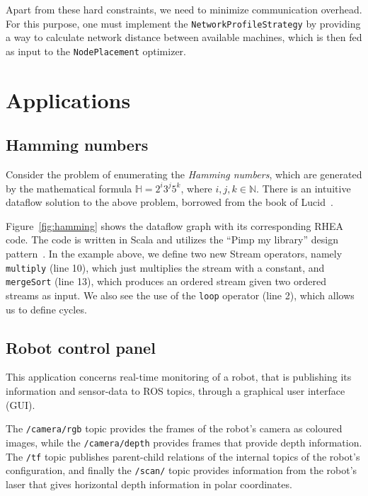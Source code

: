 \documentclass[sigplan,screen]{acmart}
\begin{document}
Apart from these hard constraints, we need to minimize communication overhead.
For this purpose, one must implement the \texttt{NetworkProfileStrategy} by providing
a way to calculate network distance between available machines, which is then
fed as input to the \texttt{NodePlacement} optimizer.

\section{Applications} \label{sec:applications}

\subsection{Hamming numbers}

Consider the problem of enumerating the
\textit{Hamming numbers}, which are generated by the mathematical formula
$\mathbb{H} = 2^i3^j5^k$, where $i,j,k \in \mathbb{N}$. There is an intuitive
dataflow solution to the above problem, borrowed from the book of Lucid~\cite{lucid}.

Figure~\ref{fig:hamming} shows the dataflow graph with its corresponding \textsc{RHEA}
code.
%
%
The code is written in Scala and utilizes the ``Pimp my library'' design
pattern~\cite{pimp}. In the example above, we define two new Stream operators,
namely \texttt{multiply} (line 10), which just multiplies the stream with a constant, and
\texttt{mergeSort} (line 13), which produces an ordered stream given two ordered
streams as input. We also see the use of the \texttt{loop} operator (line 2),
which allows us to define cycles.

\subsection{Robot control panel}

This application concerns real-time monitoring of a robot, that is publishing
its information and sensor-data to ROS topics, through a
graphical user interface (GUI).

The \texttt{/camera/rgb} topic provides the frames of the robot's camera as
coloured images, while the \texttt{/camera/depth} provides frames that provide
depth information. The \texttt{/tf} topic publishes parent-child relations of
the internal topics of the robot's configuration, and finally the
\texttt{/scan/} topic provides information from the robot's laser that gives
horizontal depth information in polar coordinates.
\end{document}
